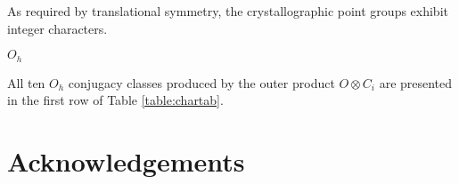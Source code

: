 \documentclass[twocolumn,showpacs,preprintnumbers,superscriptaddress,prb,floatfix,aps,10pt]{revtex4-1}
\begin{document}
As required by translational symmetry, the crystallographic point groups exhibit integer characters.







$O_h$



All ten $O_h$ conjugacy classes produced by the outer product $O \otimes C_i$ are presented in the first row of Table \ref{table:chartab}.




%
%
%



\section{Acknowledgements}


\clearpage
\appendix
\end{document}
